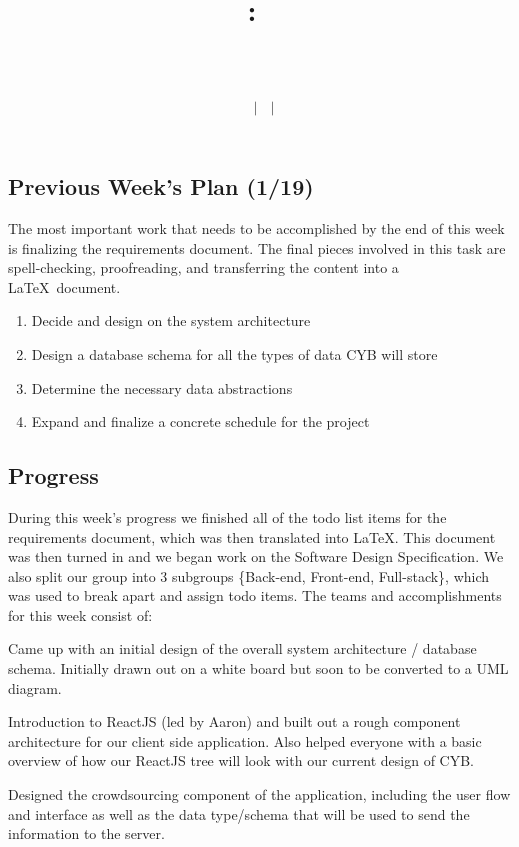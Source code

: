 \documentclass[12pt]{article}
\title{
    \vspace{2in}
    \textmd{\textbf{\hmwkClass:\ \hmwkTitle}}\\
    \vspace{0.1in}\large{\textit{\hmwkClassInstructor\ \hmwkClassTime}}\\
    \author{\textbf{\hmwkAuthorName\ $\vert$ \hmwkAuthorCSE\ $\vert$ \hmwkAuthorId}}
}
\date{}
\begin{document}
\subsection{Previous Week's Plan (1/19)}

The most important work that needs to be accomplished by the end of this week is finalizing the requirements document. The final pieces involved in this task are spell-checking, proofreading, and transferring the content into a \LaTeX\ document.

\begin{enumerate}
    \setlength\itemsep{-0.5em}
    \item Decide and design on the system architecture
    \item Design a database schema for all the types of data CYB will store
    \item Determine the necessary data abstractions
    \item Expand and finalize a concrete schedule for the project
\end{enumerate}

\subsection{Progress}

During this week's progress we finished all of the todo list items for the requirements document, which was then translated into \LaTeX. This document was then turned in and we began work on the Software Design Specification. We also split our group into 3 subgroups \{Back-end, Front-end, Full-stack\}, which was used to break apart and assign todo items. The teams and accomplishments for this week consist of:

\begin{description}
    \setlength\itemsep{0em}
    \item[Back-end (Nick, Todd, Riley)] Came up with an initial design of the overall system architecture / database schema. Initially drawn out on a white board but soon to be converted to a UML diagram.
    \item[Front-end (Aaron, Roee, Geoffrey)] Introduction to ReactJS (led by Aaron) and built out a rough component architecture for our client side application. Also helped everyone with a basic overview of how our ReactJS tree will look with our current design of CYB.
    \item[Full-stack (Sonja, Ryan)] Designed the crowdsourcing component of the application, including the user flow and interface as well as the data type/schema that will be used to send the information to the server.
\end{description}
\end{document}
